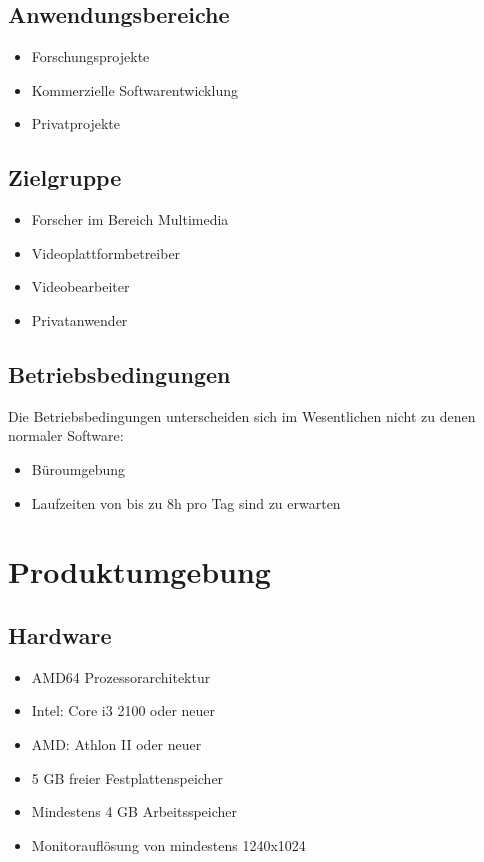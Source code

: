 \documentclass[parskip=full]{scrartcl}
\begin{document}
\subsection{Anwendungsbereiche}
\begin{itemize}
\item Forschungsprojekte
\item Kommerzielle Softwarentwicklung
\item Privatprojekte
\end{itemize}
\subsection{Zielgruppe}
\begin{itemize}
\item Forscher im Bereich Multimedia
\item Videoplattformbetreiber
\item Videobearbeiter
\item Privatanwender
\end{itemize}
\subsection{Betriebsbedingungen}
Die Betriebsbedingungen unterscheiden sich im Wesentlichen nicht zu denen normaler 
\linebreak
Software:
\begin{itemize}
\item Büroumgebung
\item Laufzeiten von bis zu 8h pro Tag sind zu erwarten
\end{itemize}
\newpage
\section{Produktumgebung}

\subsection{Hardware}
\begin{itemize}
\item AMD64 Prozessorarchitektur
\item Intel: Core i3 2100 oder neuer
\item AMD: Athlon II oder neuer
\item 5 GB freier Festplattenspeicher
\item Mindestens 4 GB Arbeitsspeicher
\item Monitorauflösung von mindestens 1240x1024
\end{itemize}
\end{document}
